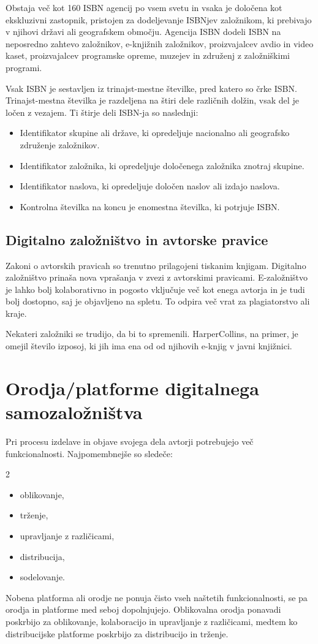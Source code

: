 \documentclass[a4paper, 12pt]{book}
\newcommand{\fixspacing}{\vspace{0pt plus 1filll}\mbox{}}
\begin{document}
Obstaja več kot 160 ISBN agencij po vsem svetu in vsaka je določena kot ekskluzivni zastopnik, pristojen za dodeljevanje ISBNjev založnikom, ki prebivajo v njihovi državi ali geografskem območju. Agencija ISBN dodeli ISBN na neposredno zahtevo založnikov, e-knjižnih založnikov, proizvajalcev avdio in video kaset, proizvajalcev programske opreme, muzejev in združenj z založniškimi programi. 

Vsak ISBN je sestavljen iz trinajst-mestne številke, pred katero so črke ISBN. Trinajst-mestna številka je razdeljena na štiri dele različnih dolžin, vsak del je ločen z vezajem. Ti štirje deli ISBN-ja so naslednji:
\begin{itemize}
	\item Identifikator skupine ali države, ki opredeljuje nacionalno ali geografsko združenje založnikov.
	\item Identifikator založnika, ki opredeljuje določenega založnika znotraj skupine.
	\item Identifikator naslova, ki opredeljuje določen naslov ali izdajo naslova.
	\item Kontrolna številka na koncu je enomestna številka, ki potrjuje ISBN. 
\end{itemize}

\section{Digitalno založništvo in avtorske pravice}
Zakoni o avtorskih pravicah so trenutno prilagojeni tiskanim knjigam. Digitalno založništvo prinaša nova vprašanja v zvezi z avtorskimi pravicami. E-založništvo je lahko bolj kolaborativno in pogosto vključuje več kot enega avtorja in  je tudi bolj dostopno, saj je objavljeno na spletu. To odpira več vrat za plagiatorstvo ali kraje. \cite{42}

Nekateri založniki se trudijo, da bi to spremenili. HarperCollins, na primer, je omejil število izposoj, ki jih ima ena od od njihovih e-knjig v javni knjižnici. \cite{43}

\chapter{Orodja/platforme digitalnega samozaložništva}
Pri procesu izdelave in objave svojega dela avtorji potrebujejo več funkcionalnosti. Najpomembnejše so sledeče:
\begin{multicols}{2}
	\begin{itemize}
		\item oblikovanje,
		\item trženje,
		\item upravljanje z različicami,
		\item distribucija,
		\item sodelovanje.
	\end{itemize}
	\fixspacing
\end{multicols}
Nobena platforma ali orodje ne ponuja čisto vseh naštetih funkcionalnosti, se pa orodja in platforme med seboj dopolnjujejo. Oblikovalna orodja ponavadi poskrbijo za oblikovanje, kolaboracijo in upravljanje z različicami, medtem ko distribucijske platforme poskrbijo za distribucijo in trženje.
\end{document}
